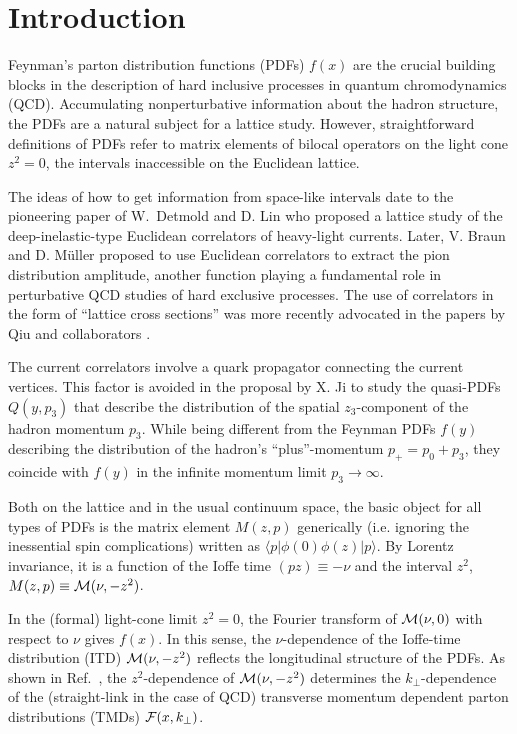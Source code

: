 \section{Introduction}

Feynman's parton distribution functions (PDFs) \cite{Feynman:1973xc}  $f(x)$
are  the crucial building blocks in the description of hard inclusive processes
in quantum chromodynamics (QCD).
Accumulating nonperturbative  information about
the hadron structure,   the PDFs  are a natural subject for
a lattice study.
 However, straightforward definitions of  PDFs
refer to    matrix elements
of bilocal operators on   the light cone $z^2=0$,
the intervals inaccessible on   the   Euclidean lattice.

The ideas of how to    get  information  from space-like intervals
date to the pioneering paper of  \mbox{W. Detmold}   and D. Lin
\cite{Detmold:2005gg}  who proposed a   lattice study
of  the deep-inelastic-type Euclidean correlators   of heavy-light  currents.
Later, V. Braun and D. M\"uller
\cite{Braun:2007wv}
proposed to use   Euclidean correlators to
extract  the pion
distribution amplitude,
another   function \cite{Radyushkin:1977gp} playing a fundamental role in  perturbative QCD studies
of  hard exclusive processes.
The use of correlators in the form of ``lattice cross sections''  was more recently
  advocated in the papers
by Qiu and collaborators \cite{Ma:2014jla,Ma:2017pxb}.

The current correlators involve a quark propagator connecting the current vertices.
This factor is avoided in   the  proposal   by X. Ji   \cite{Ji:2013dva}  to study  the
quasi-PDFs $Q(y,p_3)$  that describe the  distribution
of the spatial $z_3$-component of the hadron momentum $p_3$.
While being different from the Feynman PDFs $f(y)$ describing the distribution
of the hadron's ``plus''-momentum $p_+=p_0+p_3$,
they  coincide with  $f(y)$ in  the infinite momentum limit
$p_3\to \infty$.

Both on the lattice and in the usual continuum space,
the basic object for all types of PDFs is the
matrix element $M(z,p)$ generically
(i.e. ignoring the inessential spin complications)
 written as $\langle  p | \phi (0)  \phi(z)  | p \rangle $.
 By Lorentz invariance, it is a function of the
 Ioffe time $(pz)\equiv -\nu$ \cite{Ioffe:1969kf} and the interval $z^2$,
 $M(z,p) \equiv {\cal M} (\nu, -z^2)$.

 In the (formal)  light-cone  limit $z^2=0$, the Fourier transform
 of  $ {\cal M} (\nu, 0)$ with respect to $\nu$
 gives $f(x)$.  In this sense, the $\nu$-dependence of
 the Ioffe-time distribution (ITD) ${\cal M} (\nu, -z^2)$ reflects
 the longitudinal structure of the PDFs.
 As shown in \mbox{Ref. \cite{Radyushkin:2016hsy}},
 the \mbox{$z^2$-dependence}  of  ${\cal M} (\nu, -z^2)$ determines
 the \mbox{$k_\perp$-dependence}  of the  (straight-link in the case of QCD)
  transverse momentum dependent
 parton distributions (TMDs) ${\cal F} (x, k_\perp)$.


